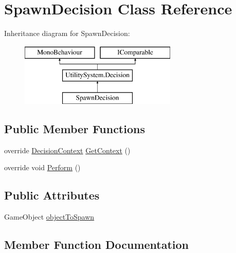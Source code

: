 \hypertarget{class_spawn_decision}{}\section{Spawn\+Decision Class Reference}
\label{class_spawn_decision}
Inheritance diagram for Spawn\+Decision\+:\begin{figure}[H]
\begin{center}
\leavevmode
\includegraphics[height=3.000000cm]{class_spawn_decision}
\end{center}
\end{figure}
\subsection*{Public Member Functions}
\begin{DoxyCompactItemize}
\item 
override \mbox{\hyperlink{class_utility_system_1_1_decision_context}{Decision\+Context}} \mbox{\hyperlink{class_spawn_decision_a8c2019e64b2353e9c0eb314cc0e804d7}{Get\+Context}} ()
\item 
override void \mbox{\hyperlink{class_spawn_decision_a7f943d8fd313e6a38f26b223e4b4dba7}{Perform}} ()
\end{DoxyCompactItemize}
\subsection*{Public Attributes}
\begin{DoxyCompactItemize}
\item 
Game\+Object \mbox{\hyperlink{class_spawn_decision_af271fdcf4d0d835a2c4eaf7c9263433d}{object\+To\+Spawn}}
\end{DoxyCompactItemize}


\subsection{Member Function Documentation}
\mbox{\label{class_spawn_decision_a8c2019e64b2353e9c0eb314cc0e804d7}} 
